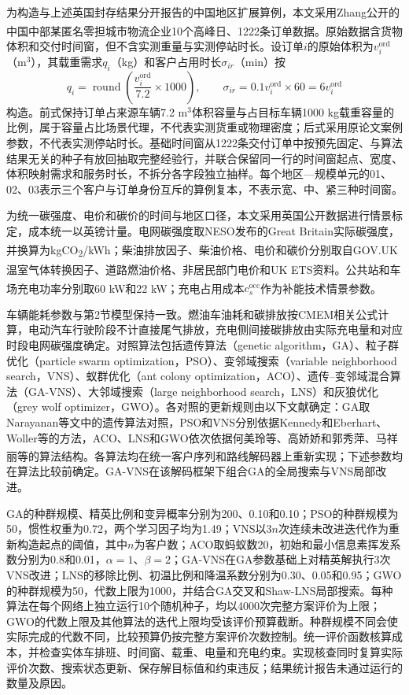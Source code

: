 \documentclass{setp-new}
\begin{document}
为构造与上述英国封存结果分开报告的中国地区扩展算例，本文采用Zhang公开的中国中部某匿名零担城市物流企业10个高峰日、1222条订单数据\textsuperscript{\cite{ref:65}}。原始数据含货物体积和交付时间窗，但不含实测重量与实测停站时长。设订单$i$的原始体积为$v_i^{\mathrm{ord}}$（m$^3$），其载重需求$q_i$（kg）和客户占用时长$\sigma_{ir}$（min）按
\[
q_i=\operatorname{round}\!\left(\frac{v_i^{\mathrm{ord}}}{7.2}\times1000\right),\qquad
\sigma_{ir}=0.1v_i^{\mathrm{ord}}\times60=6v_i^{\mathrm{ord}}
\]
构造。前式保持订单占来源车辆7.2 m$^3$体积容量与占目标车辆1000 kg载重容量的比例，属于容量占比场景代理，不代表实测货重或物理密度；后式采用原论文案例参数，不代表实测停站时长。基础时间窗从1222条交付订单中按预先固定、与算法结果无关的种子有放回抽取完整经验行，并联合保留同一行的时间窗起点、宽度、体积映射需求和服务时长，不拆分各字段独立抽样。每个地区—规模单元的01、02、03表示三个客户与订单身份互斥的算例复本，不表示宽、中、紧三种时间窗。

为统一碳强度、电价和碳价的时间与地区口径，本文采用英国公开数据进行情景标定，成本统一以英镑计量。电网碳强度取NESO发布的Great Britain实际碳强度，并换算为kgCO\textsubscript{2}/kWh\textsuperscript{\cite{ref:29,ref:30}}；柴油排放因子、柴油价格、电价和碳价分别取自GOV.UK温室气体转换因子、道路燃油价格、非居民部门电价和UK ETS资料\textsuperscript{\cite{ref:31,ref:32,ref:33,ref:34,ref:35}}。公共站和车场充电功率分别取60 kW和22 kW\textsuperscript{\cite{ref:62,ref:63}}；充电占用成本$c_s^{\mathrm{occ}}$作为补能技术情景参数。

车辆能耗参数与第2节模型保持一致。燃油车油耗和碳排放按CMEM相关公式计算，电动汽车行驶阶段不计直接尾气排放，充电侧间接碳排放由实际充电量和对应时段电网碳强度确定。对照算法包括遗传算法（genetic algorithm，GA）、粒子群优化（particle swarm optimization，PSO）、变邻域搜索（variable neighborhood search，VNS）、蚁群优化（ant colony optimization，ACO）、遗传--变邻域混合算法（GA-VNS）、大邻域搜索（large neighborhood search，LNS）和灰狼优化（grey wolf optimizer，GWO）。各对照的更新规则由以下文献确定：GA取Narayanan等文中的遗传算法对照，PSO和VNS分别依据Kennedy和Eberhart、Woller等的方法，ACO、LNS和GWO依次依据何美玲等、高娇娇和郭秀萍、马祥丽等的算法结构\textsuperscript{\cite{ref:56,ref:57,ref:58,ref:59,ref:60,ref:61}}。各算法均在统一客户序列和路线解码器上重新实现；下述参数均在算法比较前确定。GA-VNS在该解码框架下组合GA的全局搜索与VNS局部改进。

GA的种群规模、精英比例和变异概率分别为200、0.10和0.10；PSO的种群规模为50，惯性权重为0.72，两个学习因子均为1.49；VNS以$3n$次连续未改进迭代作为重新构造起点的阈值，其中$n$为客户数；ACO取蚂蚁数20，初始和最小信息素挥发系数分别为0.8和0.01，$\alpha=1$、$\beta=2$；GA-VNS在GA参数基础上对精英解执行3次VNS改进；LNS的移除比例、初温比例和降温系数分别为0.30、0.05和0.95；GWO的种群规模为50，代数上限为1000，并结合GA交叉和Shaw-LNS局部搜索。每种算法在每个网络上独立运行10个随机种子，均以4000次完整方案评价为上限；GWO的代数上限及其他算法的迭代上限均受该评价预算截断。种群规模不同会使实际完成的代数不同，比较预算仍按完整方案评价次数控制。统一评价函数核算成本，并检查实体车排班、时间窗、载重、电量和充电约束。实现核查同时复算实际评价次数、搜索状态更新、保存解目标值和约束违反；结果统计报告未通过运行的数量及原因。
\end{document}
